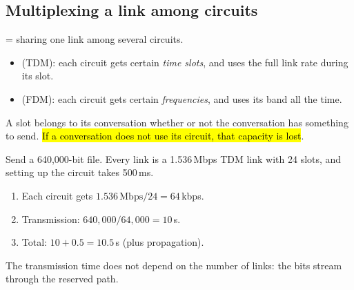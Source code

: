 \subsection{Multiplexing a link among circuits}

\begin{defn}
 = sharing one link among several circuits.
\begin{itemize}
  \item {} (TDM): each circuit gets certain \emph{time slots}, and uses the full link rate during its slot.
  \item {} (FDM): each circuit gets certain \emph{frequencies}, and uses its band all the time.
\end{itemize}
\end{defn}



\begin{pitfall}
A slot belongs to its conversation whether or not the conversation has something to send. \hl{If a conversation does not use its circuit, that capacity is lost}.
\end{pitfall}

\begin{example}
Send a 640{,}000-bit file. Every link is a 1.536\,Mbps TDM link with 24 slots, and setting up the circuit takes 500\,ms.
\begin{enumerate}
  \item Each circuit gets $1.536\,\text{Mbps}/24 = 64$\,kbps.
  \item Transmission: $640{,}000/64{,}000 = 10$\,s.
  \item Total: $10 + 0.5 = 10.5$\,s (plus propagation).
\end{enumerate}
The transmission time does not depend on the number of links: the bits stream through the reserved path.
\end{example}

